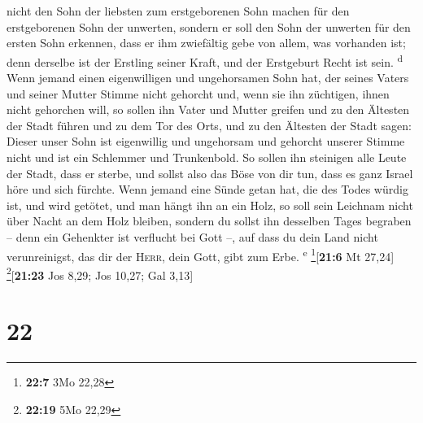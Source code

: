 nicht den Sohn der liebsten zum erstgeborenen Sohn machen für den
erstgeborenen Sohn der unwerten,  sondern er soll den
Sohn der unwerten für den ersten Sohn erkennen, dass er ihm zwiefältig
gebe von allem, was vorhanden ist; denn derselbe ist der Erstling seiner
Kraft, und der Erstgeburt Recht ist sein. \textsuperscript{d}
 Wenn jemand einen eigenwilligen und ungehorsamen Sohn
hat, der seines Vaters und seiner Mutter Stimme nicht gehorcht und, wenn
sie ihn züchtigen, ihnen nicht gehorchen will,  so sollen
ihn Vater und Mutter greifen und zu den Ältesten der Stadt führen und zu
dem Tor des Orts,  und zu den Ältesten der Stadt sagen:
Dieser unser Sohn ist eigenwillig und ungehorsam und gehorcht unserer
Stimme nicht und ist ein Schlemmer und Trunkenbold.  So
sollen ihn steinigen alle Leute der Stadt, dass er sterbe, und sollst
also das Böse von dir tun, dass es ganz Israel höre und sich fürchte.
 Wenn jemand eine Sünde getan hat, die des Todes würdig
ist, und wird getötet, und man hängt ihn an ein Holz,  so
soll sein Leichnam nicht über Nacht an dem Holz bleiben, sondern du
sollst ihn desselben Tages begraben -- denn ein Gehenkter ist verflucht
bei Gott --, auf dass du dein Land nicht verunreinigst, das dir der
\textsc{Herr}, dein Gott, gibt zum Erbe. \textsuperscript{e}
\footnote{\textbf{22:7} 3Mo 22,28}{[}\textbf{21:6} Mt 27,24{]}
\footnote{\textbf{22:19} 5Mo 22,29}{[}\textbf{21:23} Jos 8,29; Jos
10,27; Gal 3,13{]}

\hypertarget{section-21}{%
\section{22}\label{section-21}}

